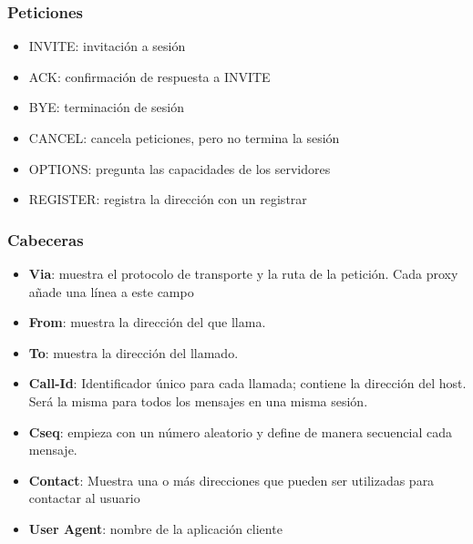 \documentclass{beamer}
\begin{document}

\begin{frame}
\frametitle{Peticiones}

\begin{itemize}
\item INVITE: invitación a sesión
\item ACK: confirmación de respuesta a INVITE
\item BYE: terminación de sesión
\item CANCEL: cancela peticiones, pero no termina la sesión
\item OPTIONS: pregunta las capacidades de los servidores
\item REGISTER: registra la dirección con un registrar
\end{itemize}

\end{frame}


\begin{frame}
\frametitle{Cabeceras}

\begin{itemize}
\item {\bf Via}: muestra el protocolo de transporte y la ruta de la petición. Cada proxy añade una línea a este campo
\item {\bf From}: muestra la dirección del que llama.
\item {\bf To}: muestra la dirección del llamado.
\item {\bf Call-Id}: Identificador único para cada llamada; contiene la dirección del host. Será la misma para todos los mensajes en una misma sesión.
\item {\bf Cseq}: empieza con un número aleatorio y define de manera secuencial cada mensaje.
\item {\bf Contact}: Muestra una o más direcciones que pueden ser utilizadas para contactar al usuario
\item {\bf User Agent}: nombre de la aplicación cliente
\end{itemize}

\end{frame}


\end{document}
